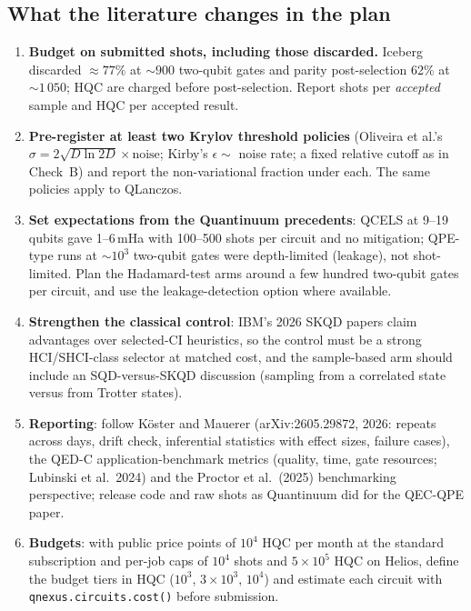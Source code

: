 \documentclass[11pt,a4paper]{article}
\begin{document}
\subsection{What the literature changes in the plan}
\begin{enumerate}
\item \textbf{Budget on submitted shots, including those discarded.} Iceberg discarded $\approx77\%$ at $\sim900$ two-qubit gates and parity post-selection 62\% at $\sim1\,050$; HQC are charged before post-selection. Report shots per \emph{accepted} sample and HQC per accepted result.
\item \textbf{Pre-register at least two Krylov threshold policies} (Oliveira et al.'s $\sigma=2\sqrt{D\ln 2D}\times\text{noise}$; Kirby's $\epsilon\sim$ noise rate; a fixed relative cutoff as in Check~B) and report the non-variational fraction under each. The same policies apply to QLanczos.
\item \textbf{Set expectations from the Quantinuum precedents}: QCELS at 9--19 qubits gave 1--6\,mHa with 100--500 shots per circuit and no mitigation; QPE-type runs at $\sim10^3$ two-qubit gates were depth-limited (leakage), not shot-limited. Plan the Hadamard-test arms around a few hundred two-qubit gates per circuit, and use the leakage-detection option where available.
\item \textbf{Strengthen the classical control}: IBM's 2026 SKQD papers claim advantages over selected-CI heuristics, so the control must be a strong HCI/SHCI-class selector at matched cost, and the sample-based arm should include an SQD-versus-SKQD discussion (sampling from a correlated state versus from Trotter states).
\item \textbf{Reporting}: follow K\"oster and Mauerer (arXiv:2605.29872, 2026: repeats across days, drift check, inferential statistics with effect sizes, failure cases), the QED-C application-benchmark metrics (quality, time, gate resources; Lubinski et al.\ 2024) and the Proctor et al.\ (2025) benchmarking perspective; release code and raw shots as Quantinuum did for the QEC-QPE paper.
\item \textbf{Budgets}: with public price points of $10^4$ HQC per month at the standard subscription and per-job caps of $10^4$ shots and $5\times10^5$ HQC on Helios, define the budget tiers in HQC ($10^3$, $3\times10^3$, $10^4$) and estimate each circuit with \texttt{qnexus.circuits.cost()} before submission.
\end{enumerate}
\end{document}
